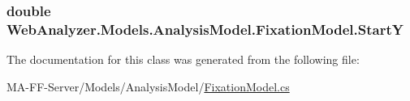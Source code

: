 \subsubsection[{Start\+Y}]{\setlength{\rightskip}{0pt plus 5cm}double Web\+Analyzer.\+Models.\+Analysis\+Model.\+Fixation\+Model.\+Start\+Y\hspace{0.3cm}{\ttfamily [get]}}\label{class_web_analyzer_1_1_models_1_1_analysis_model_1_1_fixation_model_a187714460ee0851def122bd776fbda91}


The documentation for this class was generated from the following file\+:\begin{DoxyCompactItemize}
\item 
M\+A-\/\+F\+F-\/\+Server/\+Models/\+Analysis\+Model/\hyperlink{_fixation_model_8cs}{Fixation\+Model.\+cs}\end{DoxyCompactItemize}
